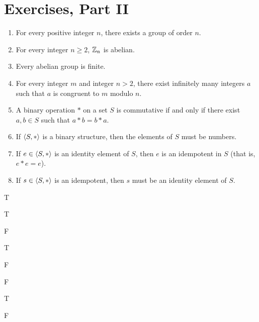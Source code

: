 \pagebreak
\section{Exercises, Part II}

\begin{exercise}[ID=2A]
\tf

\begin{enumerate}
\item For every positive integer $n$, there exists a group of order $n$.

\item For every integer $n\geq 2$, $\mathbb{Z}_n$ is abelian.

\item Every abelian group is finite.

\item For every integer $m$ and integer $n>2$, there exist infinitely many integers $a$ such that $a$ is congruent to $m$ modulo $n$.

\item A binary operation $*$ on a set $S$ is commutative if and only if there exist $a,b\in S$ such that $a*b=b*a$.

\item If $\langle S, *\rangle$ is a binary structure, then the elements of $S$ must be numbers.

\item If $e\in \langle S,*\rangle$ is an identity element of $S$, then $e$ is an idempotent in $S$ (that is, $e*e=e$).

\item If $s\in \langle S,*\rangle$ is an idempotent, then $s$ must be an identity element of $S$.
\end{enumerate}
\end{exercise}

\begin{solution}[print=false]


\noindent
\begin{inparaenum}[(a)]
\item T \hfill \item T  \hfill \item  F  \hfill \item T  \hfill \item F  \hfill \item F  \hfill \item T   \hfill\item F
\end{inparaenum}

\end{solution}


